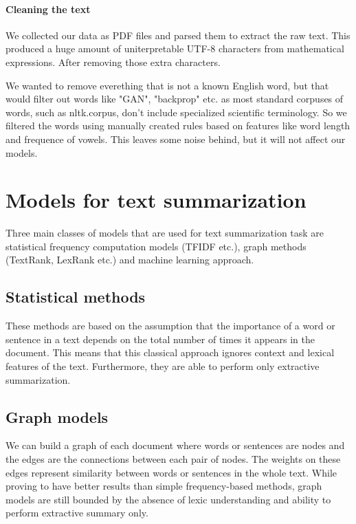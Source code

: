 \documentclass[sigplan]{acmart}
\begin{document}
\paragraph{Cleaning the text} We collected our data as PDF files and parsed them to extract the raw text. This produced a huge amount of uniterpretable UTF-8 characters from mathematical expressions. After removing those extra characters.

We wanted to remove everething that is not a known English word, but that would filter out words like "GAN", "backprop" etc. as most standard corpuses of words, such as nltk.corpus, don't include specialized scientific terminology. So we filtered the words using manually created rules based on features like word length and frequence of vowels. This leaves some noise behind, but it will not affect our models.

\section{Models for text summarization}

Three main classes of models that are used for text summarization task are statistical frequency computation models (TFIDF etc.), graph methods (TextRank, LexRank etc.) and machine learning approach.

\subsection{Statistical methods}

These methods are based on the assumption that the importance of a word or sentence in a text depends on the total number of times it appears in the document. This means that this classical approach ignores context and lexical features of the text. Furthermore, they are able to perform only extractive summarization.

\subsection{Graph models}

We can build a graph of each document where words or sentences are nodes and the edges are the connections between each pair of nodes. The weights on these edges represent similarity between words or sentences in the whole text. While proving to have better results than simple frequency-based methods, graph models are still bounded by the absence of lexic understanding and ability to perform extractive summary only.
\end{document}

